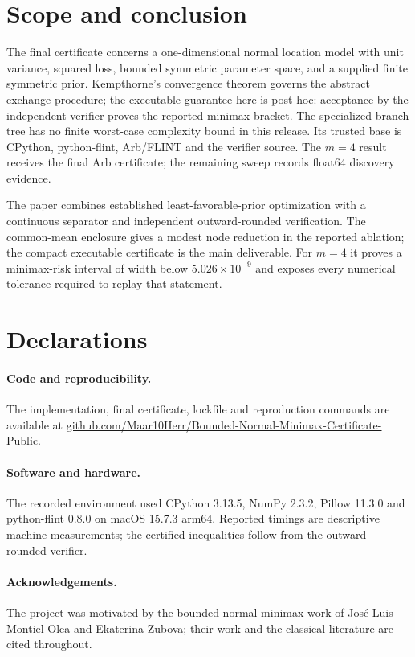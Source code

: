\section{Scope and conclusion}
\label{sec:conclusion}

The final certificate concerns a one-dimensional normal location model with
unit variance, squared loss, bounded symmetric parameter space, and a supplied
finite symmetric prior.  Kempthorne's convergence theorem governs the abstract
exchange procedure; the executable guarantee here is post hoc: acceptance by
the independent verifier proves the reported minimax bracket.  The specialized
branch tree has no finite worst-case complexity bound in this release.  Its
trusted base is CPython, python-flint, Arb/FLINT and the verifier source.  The
$m=4$ result receives the final Arb certificate; the remaining sweep records
float64 discovery evidence.

The paper combines established least-favorable-prior optimization with a
continuous separator and independent outward-rounded verification.  The
common-mean enclosure gives a modest node reduction in the reported ablation;
the compact executable certificate is the main deliverable.  For $m=4$ it
proves a minimax-risk interval of width below $5.026\times10^{-9}$ and exposes
every numerical tolerance required to replay that statement.

\section*{Declarations}

\paragraph{Code and reproducibility.}
The implementation, final certificate, lockfile and reproduction commands are
available at
\href{https://github.com/Maar10Herr/Bounded-Normal-Minimax-Certificate-Public}
{github.com/Maar10Herr/Bounded-Normal-Minimax-Certificate-Public}.

\paragraph{Software and hardware.}
The recorded environment used CPython 3.13.5, NumPy 2.3.2, Pillow 11.3.0 and
python-flint 0.8.0 on macOS 15.7.3 arm64.  Reported timings are descriptive
machine measurements; the certified inequalities follow from the outward-
rounded verifier.

\paragraph{Acknowledgements.}
The project was motivated by the bounded-normal minimax work of Jos\'e Luis
Montiel Olea and Ekaterina Zubova; their work and the classical literature
are cited throughout.
